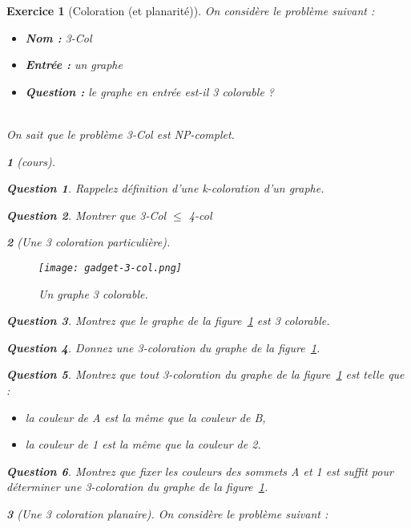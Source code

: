 \documentclass{article}
\theoremstyle{exostyle}
\newtheorem{exo}{Exercice}
\theoremstyle{partiestyle}
\newtheorem{partie}{}[exo]
\theoremstyle{questionstyle}
\newtheorem{questionpartie}{Question}[partie]
\begin{document}
\begin{exo}[Coloration (et planarité)]
	On considère le problème suivant :

	\begin{itemize}
		\item {\bf Nom :} 3-Col
		\item {\bf Entrée :} un graphe
		\item {\bf Question :} le graphe en entrée est-il 3 colorable ?
	\end{itemize}
~\\
	On sait que le problème 3-Col est NP-complet.
	\begin{partie}[cours]
		\begin{questionpartie}
			Rappelez définition d'une k-coloration d'un graphe.
		\end{questionpartie}
		\begin{questionpartie}
			Montrer que 3-Col $\leq$ 4-col
		\end{questionpartie}
	\end{partie}

	\begin{partie}[Une 3 coloration particulière]
~\\
\vspace*{-2cm}
		\begin{figure}[h!]
			\vspace{1cm}
			\begin{center}
				\texttt{[image: gadget-3-col.png]}
			\end{center}
			\caption{Un graphe 3 colorable.\label{fig-gadget}}
		\end{figure}
		
		\begin{questionpartie}
			Montrez que le graphe de la figure~\ref{fig-gadget} est 3 colorable.
		\end{questionpartie}
		\begin{questionpartie}
			Donnez une 3-coloration du graphe de la figure~\ref{fig-gadget}.
		\end{questionpartie}
		\begin{questionpartie}
			Montrez que tout 3-coloration du graphe de la figure~\ref{fig-gadget} est telle que :
			\begin{itemize}
				\item la couleur de A est la même que la couleur de B,
				\item la couleur de 1 est la même que la couleur de 2.
			\end{itemize}
		\end{questionpartie}
		\begin{questionpartie}
			Montrez que fixer les couleurs des sommets A et 1 est suffit pour déterminer une 3-coloration du graphe de la figure~\ref{fig-gadget}.
		\end{questionpartie}
	\end{partie}
	\begin{partie}[Une 3 coloration planaire]
	On considère le problème suivant :


\end{partie}
\end{exo}
\end{document}
